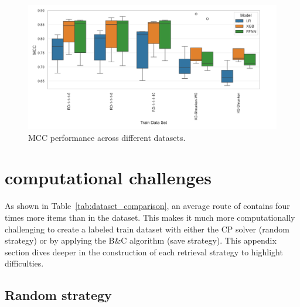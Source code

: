 \begin{figure}[!ht]
	\centering
	\includegraphics[width = \textwidth]{pictures/krebs_results/krebs_mcc_across_DS.png}
	\caption{MCC performance across different \krebsADataSetText datasets.}
	\label{fig:krebs_performance_datasets}
\end{figure}

\chapter{\krebsADataSetText computational challenges}
\label{app:sec:krebs_computationally_challenges}

As shown in Table~\ref{tab:dataset_comparison}, an average route of \krebsADataSetText contains four times more items than
in the \gendreauDataSetText dataset. This makes it much more computationally challenging to create a labeled train dataset with either
the \gls{CP} solver (random strategy) or by applying the B\&C algorithm (save strategy). This appendix section dives deeper in
the construction of each retrieval strategy to highlight difficulties.

\section{Random strategy}
\label{sec:challenges_krebs_random}

